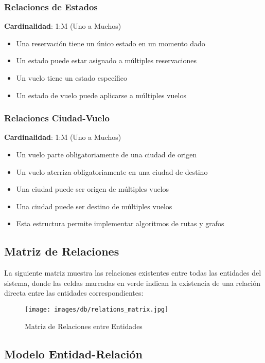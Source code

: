 \documentclass[12pt,a4paper]{article}
\begin{document}
\subsubsection{Relaciones de Estados}
\textbf{Cardinalidad}: 1:M (Uno a Muchos)
\begin{itemize}
    \item Una reservación tiene un único estado en un momento dado
    \item Un estado puede estar asignado a múltiples reservaciones
    \item Un vuelo tiene un estado específico
    \item Un estado de vuelo puede aplicarse a múltiples vuelos
\end{itemize}

\subsubsection{Relaciones Ciudad-Vuelo}
\textbf{Cardinalidad}: 1:M (Uno a Muchos)
\begin{itemize}
    \item Un vuelo parte obligatoriamente de una ciudad de origen
    \item Un vuelo aterriza obligatoriamente en una ciudad de destino
    \item Una ciudad puede ser origen de múltiples vuelos
    \item Una ciudad puede ser destino de múltiples vuelos
    \item Esta estructura permite implementar algoritmos de rutas y grafos
\end{itemize}

\subsection{Matriz de Relaciones}

La siguiente matriz muestra las relaciones existentes entre todas las entidades del sistema, donde las celdas marcadas en verde indican la existencia de una relación directa entre las entidades correspondientes:

\begin{figure}[H]
    \centering
    \texttt{[image: images/db/relations\_matrix.jpg]}
    \caption{Matriz de Relaciones entre Entidades}
    \label{fig:matriz_relaciones}
\end{figure}

\subsection{Modelo Entidad-Relación}
\end{document}
